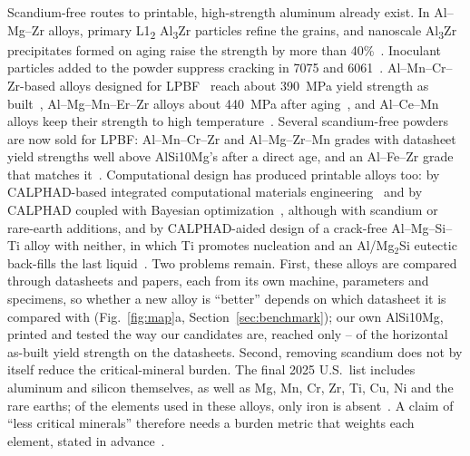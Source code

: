 \documentclass[preprint,12pt]{elsarticle}
\newcommand{\AlSi}{AlSi10Mg\xspace}
\begin{document}
Scandium-free routes to printable, high-strength aluminum already exist.
In Al--Mg--Zr alloys, primary L1\textsubscript{2} Al\textsubscript{3}Zr particles refine the grains, and nanoscale Al\textsubscript{3}Zr precipitates formed on aging raise the strength by more than 40\%~\cite{croteau2018}.
Inoculant particles added to the powder suppress cracking in 7075 and 6061~\cite{martin2017,opprecht2020}.
Al--Mn--Cr--Zr-based alloys designed for LPBF~\cite{almncr2022,alloyF2024} reach about \SI{390}{MPa} yield strength as built~\cite{almncrzr2024}, Al--Mg--Mn--Er--Zr alloys about \SI{440}{MPa} after aging~\cite{almgmnerzr2022}, and Al--Ce--Mn alloys keep their strength to high temperature~\cite{plotkowski2020}.
Several scandium-free powders are now sold for LPBF: Al--Mn--Cr--Zr and Al--Mg--Zr--Mn grades with datasheet yield strengths well above \AlSi's after a direct age, and an Al--Fe--Zr grade that matches it~\cite{ds_hoganas,ds_al5x1,ds_cp1}.
Computational design has produced printable alloys too: by CALPHAD-based integrated computational materials engineering~\cite{thapliyal2020} and by CALPHAD coupled with Bayesian optimization~\cite{taherimousavi2025}, although with scandium or rare-earth additions, and by CALPHAD-aided design of a crack-free Al--Mg--Si--Ti alloy with neither, in which Ti promotes nucleation and an Al/Mg$_2$Si eutectic back-fills the last liquid~\cite{wen2024}.
Two problems remain.
First, these alloys are compared through datasheets and papers, each from its own machine, parameters and specimens, so whether a new alloy is ``better'' depends on which datasheet it is compared with (Fig.~\ref{fig:map}a, Section~\ref{sec:benchmark}); our own \AlSi, printed and tested the way our candidates are, reached only \InhouseRatioLo--\InhouseRatioHi{} of the horizontal as-built yield strength on the datasheets.
Second, removing scandium does not by itself reduce the critical-mineral burden. The final 2025 U.S.\ list includes aluminum and silicon themselves, as well as Mg, Mn, Cr, Zr, Ti, Cu, Ni and the rare earths; of the elements used in these alloys, only iron is absent~\cite{fr2025}. A claim of ``less critical minerals'' therefore needs a burden metric that weights each element, stated in advance~\cite{graedel2012,mulukutla2025}.
\end{document}
